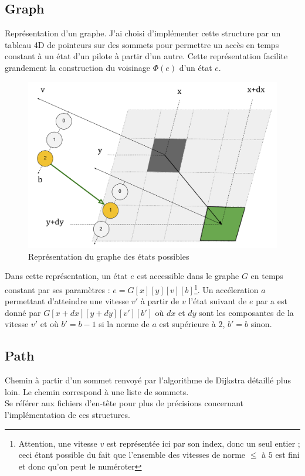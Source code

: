 \documentclass[a4paper,10pt]{article}
\begin{document}
\subsection{Graph} Représentation d'un graphe. J'ai choisi d'implémenter cette structure par un tableau 4D de pointeurs sur des sommets pour permettre un accès en temps constant à un état d'un pilote à partir d'un autre.
Cette représentation facilite grandement la construction du voisinage $\Phi(e)$ d'un état $e$.
\begin{figure}[!h]
\centering
\includegraphics[scale=0.5]{graph.pdf}
\caption{Représentation du graphe des états possibles}
\end{figure}
\noindent
Dans cette représentation, un état $e$ est accessible dans le graphe $G$ en temps constant par ses paramètres : $e=G[x][y][v][b]$\footnote{Attention, une vitesse $v$ est représentée ici par son index, donc un seul entier ; ceci étant
possible du fait que l'ensemble des vitesses de norme $\leq$ à $5$ est fini et donc qu'on peut le numéroter}.
Un accéleration $a$ permettant d'atteindre une vitesse $v'$ à partir de $v$ l'état suivant de $e$ par a est donné par $G[x+dx][y+dy][v'][b']$ où $dx$ et $dy$ sont les composantes de la vitesse $v'$ et où
$b'=b-1$ si la norme de $a$ est supérieure à $2$, $b'=b$ sinon.
\\
\subsection{Path} Chemin à partir d'un sommet renvoyé par l'algorithme de Dijkstra détaillé plus loin. Le chemin correspond à une liste de sommets. 
\\
Se référer aux fichiers d'en-tête pour plus de précisions concernant l'implémentation de ces structures.
\end{document}

